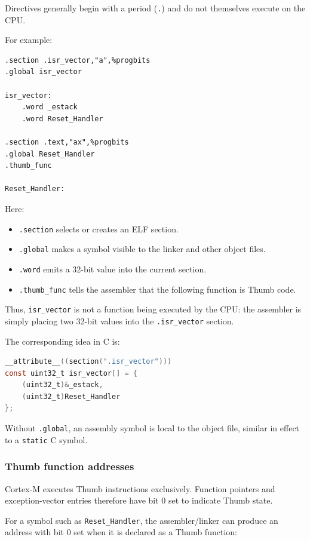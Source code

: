 \documentclass[a4paper,11pt]{article}
\begin{document}
Directives generally begin with a period (\texttt{.}) and do not themselves
execute on the CPU.

For example:

\begin{lstlisting}[language=arm]
.section .isr_vector,"a",%progbits
.global isr_vector

isr_vector:
    .word _estack
    .word Reset_Handler

.section .text,"ax",%progbits
.global Reset_Handler
.thumb_func

Reset_Handler:
\end{lstlisting}

Here:

\begin{itemize}
	\item \texttt{.section} selects or creates an ELF section.
	\item \texttt{.global} makes a symbol visible to the linker and other
	      object files.
	\item \texttt{.word} emits a 32-bit value into the current section.
	\item \texttt{.thumb\_func} tells the assembler that the following
	      function is Thumb code.
\end{itemize}

Thus, \texttt{isr\_vector} is not a function being executed by the CPU:
the assembler is simply placing two 32-bit values into the
\texttt{.isr\_vector} section.

The corresponding idea in C is:

\begin{lstlisting}[language=C]
__attribute__((section(".isr_vector")))
const uint32_t isr_vector[] = {
    (uint32_t)&_estack,
    (uint32_t)Reset_Handler
};
\end{lstlisting}

Without \texttt{.global}, an assembly symbol is local to the object file,
similar in effect to a \texttt{static} C symbol.

\subsubsection{Thumb function addresses}

Cortex-M executes Thumb instructions exclusively. Function pointers and
exception-vector entries therefore have bit 0 set to indicate Thumb state.

For a symbol such as \texttt{Reset\_Handler}, the assembler/linker can
produce an address with bit 0 set when it is declared as a Thumb function:
\end{document}
